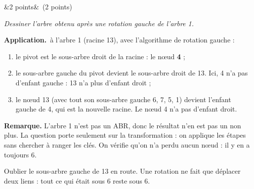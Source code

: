 \documentclass[11pt, a4paper]{exam}
\newcommand{\Q}[3]{\par\needspace{5\baselineskip}\bigskip\noindent{\large\bfseries Question #1}\ifx&#2&\else\ \textnormal{(#2)}\fi\par\nopagebreak\smallskip\noindent\textit{#3}\par\nopagebreak\smallskip}
\newcommand{\application}{\par\noindent\textbf{Application.}\ }
\begin{document}
\Q{9}{2 points}{Dessiner l'arbre obtenu après une rotation gauche de l'arbre 1.}
\begin{reponse}
\begin{center}
\end{center}
\end{reponse}
\application à l'arbre 1 (racine 13), avec l'algorithme de rotation gauche :
\begin{enumerate}
\item le pivot est le sous-arbre droit de la racine : le nœud \textbf{4} ;
\item le sous-arbre gauche du pivot devient le sous-arbre droit de 13. Ici, 4 n'a pas d'enfant gauche : 13 n'a plus d'enfant droit ;
\item le nœud 13 (avec tout son sous-arbre gauche 6, 7, 5, 1) devient l'enfant gauche de 4, qui est la nouvelle racine. Le nœud 4 n'a pas d'enfant droit.
\end{enumerate}
\textbf{Remarque.} L'arbre 1 n'est pas un ABR, donc le résultat n'en est pas un non plus. La question porte seulement sur la transformation : on applique les étapes sans chercher à ranger les clés. On vérifie qu'on n'a perdu aucun nœud : il y en a toujours 6.
\begin{erreur}
Oublier le sous-arbre gauche de 13 en route. Une rotation ne fait que déplacer deux liens : tout ce qui était sous 6 reste sous 6.
\end{erreur}
\end{document}
